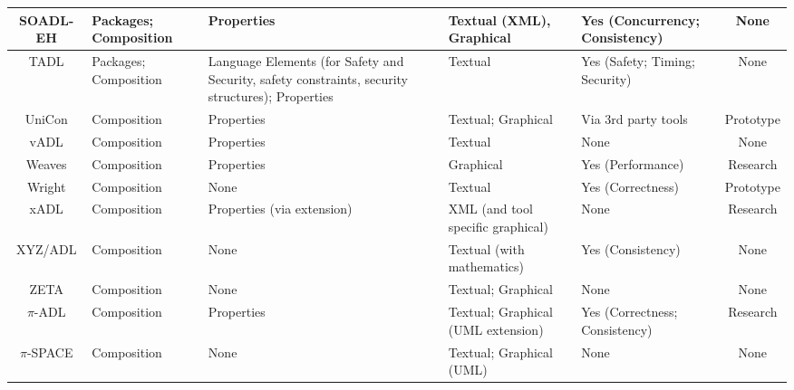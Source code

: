 \begin{landscape}
\begin{longtable}{|c|P{2cm}|P{3cm}|P{3cm}|p{2cm}|c|}
SOADL-EH & Packages; Composition & Properties & Textual (XML), Graphical & Yes (Concurrency; Consistency) & None \\ 
\hline

TADL & Packages; Composition & Language Elements (for Safety and Security, safety constraints, security structures); Properties & Textual & Yes (Safety; Timing; Security) & None \\ 
\hline

UniCon & Composition & Properties & Textual; Graphical & Via 3rd party tools & Prototype \\ 
\hline

vADL & Composition & Properties & Textual & None & None \\ 
\hline

Weaves & Composition & Properties & Graphical & Yes (Performance) & Research \\ 
\hline

Wright & Composition & None & Textual & Yes (Correctness) & Prototype \\ 
\hline

xADL & Composition & Properties (via extension) & XML (and tool specific graphical) & None & Research \\ 
\hline

XYZ/ADL & Composition & None & Textual (with mathematics) & Yes (Consistency) & None \\ 
\hline

ZETA & Composition & None & Textual; Graphical & None & None \\ 
\hline

$\pi$-ADL & Composition & Properties & Textual; Graphical (UML extension) & Yes (Correctness; Consistency) & Research \\ 
\hline

$\pi$-SPACE & Composition & None & Textual; Graphical (UML) & None & None \\ 
\hline

\end{longtable}
\end{landscape}

